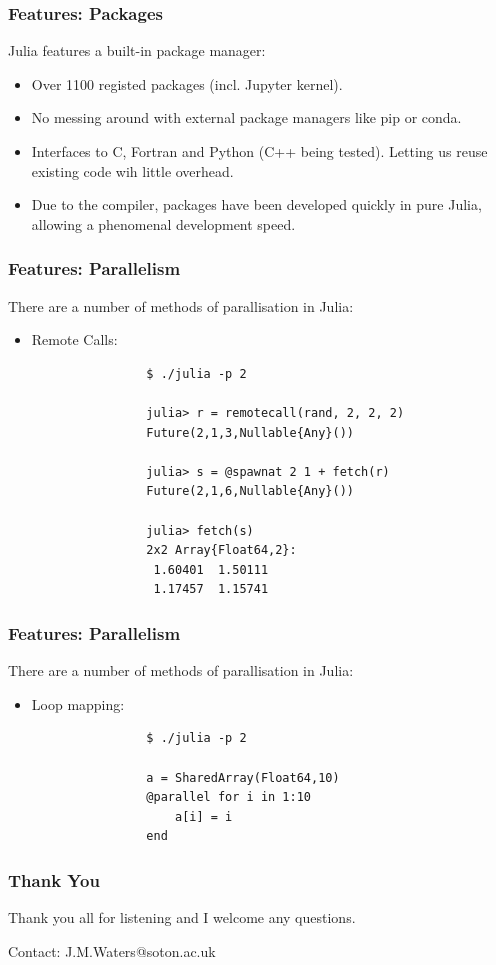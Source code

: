 \documentclass{beamer}
\begin{document}
\begin{frame}
	\frametitle{Features: Packages}

	Julia features a built-in package manager: \newline

	\begin{itemize}
		\item Over 1100 registed packages (incl. Jupyter kernel). \newline

		\item No messing around with external package managers like pip or conda. \newline

		\item Interfaces to C, Fortran and Python (C++ being tested). Letting us reuse existing code wih little overhead. \newline

		\item Due to the compiler, packages have been developed quickly in pure Julia, allowing a phenomenal development speed.
	\end{itemize}
\end{frame}

\begin{frame}[fragile]
	\frametitle{Features: Parallelism}

	There are a number of methods of parallisation in Julia: \newline

	\begin{itemize}
		\item Remote Calls:

			\begin{verbatim}
				$ ./julia -p 2

				julia> r = remotecall(rand, 2, 2, 2)
				Future(2,1,3,Nullable{Any}())

				julia> s = @spawnat 2 1 + fetch(r)
				Future(2,1,6,Nullable{Any}())

				julia> fetch(s)
				2x2 Array{Float64,2}:
				 1.60401  1.50111
				 1.17457  1.15741
			\end{verbatim}
	\end{itemize}
\end{frame}

\begin{frame}[fragile]
	\frametitle{Features: Parallelism}

	There are a number of methods of parallisation in Julia: \newline

	\begin{itemize}
		\item Loop mapping:

			\begin{verbatim}
				$ ./julia -p 2

				a = SharedArray(Float64,10)
				@parallel for i in 1:10
				    a[i] = i
				end
			\end{verbatim}
	\end{itemize}
\end{frame}

\begin{frame}
	\frametitle{Thank You}
	\begin{center}
		Thank you all for listening and I welcome any questions. \newline

		Contact: J.M.Waters@soton.ac.uk
	\end{center}
\end{frame}
\end{document}
